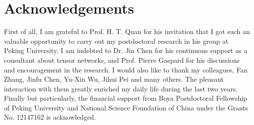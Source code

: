 \chapter{Acknowledgements}

\begin{spacing}{1.5} %
\par {\large First of all, I am grateful to Prof. H. T. Quan for his invitation that I got such an valuable opportunity to carry out my postdoctoral research in his group at Peking University. I am indebted to Dr. Jin Chen for his continuous support as a consultant about tensor networks, and Prof. Pierre Gaspard for his discussions and encouragement in the research. I would also like to thank my colleagues, Fan Zhang, Jinfu Chen, Yu-Xin Wu, Jihui Pei and many others. The pleasant interaction with them greatly enriched my daily life during the last two years. Finally but particularly, the financial support from Boya Postdoctoral Fellowship of Peking University and National Science Foundation of China under the Grants No. 12147162 is acknowledged.}
\end{spacing}
